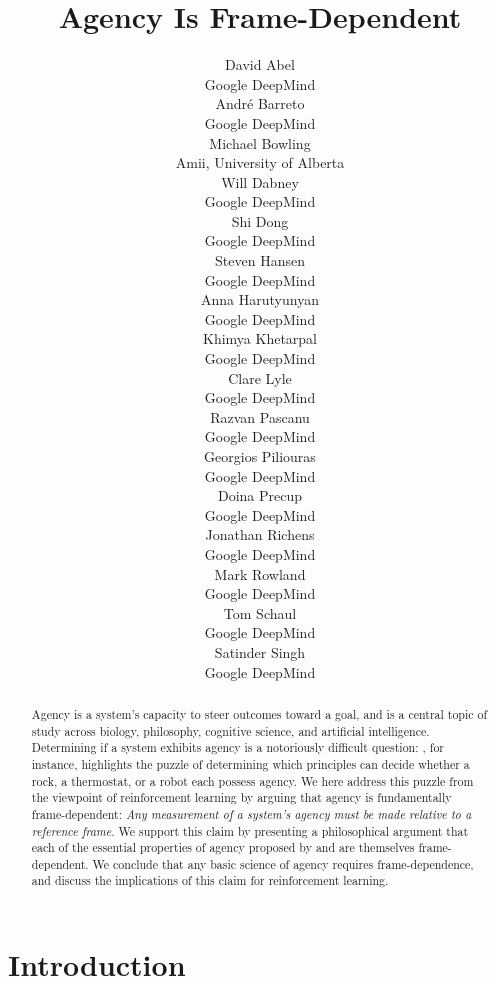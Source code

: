 \documentclass[11pt]{article} %
\title{Agency Is Frame-Dependent}
\author{
David Abel \\
Google DeepMind \\
\And
Andr{\' e} Barreto \\
Google DeepMind \\
\And
Michael Bowling \\
Amii, University of Alberta \\
\And
Will Dabney \\
Google DeepMind \\
\AND
Shi Dong \\
Google DeepMind \\
\And
Steven Hansen \\
Google DeepMind \\
\And
Anna Harutyunyan \\
Google DeepMind \\
\And
Khimya Khetarpal \\
Google DeepMind \\
\AND
Clare Lyle \\
Google DeepMind \\
\And
Razvan Pascanu \\
Google DeepMind \\
\And
Georgios Piliouras \\
Google DeepMind \\
\And
Doina Precup \\
Google DeepMind \\
\AND
Jonathan Richens \\
Google DeepMind \\
\And
Mark Rowland \\
Google DeepMind \\
\And
Tom Schaul \\
Google DeepMind \\
\And
Satinder Singh \\
Google DeepMind \\
}
\begin{document}
\maketitle

\begin{abstract}
%
Agency is a system's capacity to steer outcomes toward a goal, and is a central topic of study across biology, philosophy, cognitive science, and artificial intelligence.
%
Determining if a system exhibits agency is a notoriously difficult question: \cite{dennett1989intentional}, for instance, highlights the puzzle of determining which principles can decide whether a rock, a thermostat, or a robot each possess agency. 
%
We here address this puzzle from the viewpoint of reinforcement learning by arguing that agency is fundamentally frame-dependent: \textit{Any measurement of a system's agency must be made relative to a reference frame}. 
%
We support this claim by presenting a philosophical argument that each of the essential properties of agency proposed by \cite{barandiaran2009defining} and \cite{moreno2018minimal} are themselves frame-dependent. 
%
We conclude that any basic science of agency requires frame-dependence, and discuss the implications of this claim for reinforcement learning.
%
\end{abstract}




\startmain
\section{Introduction}
\end{document}
